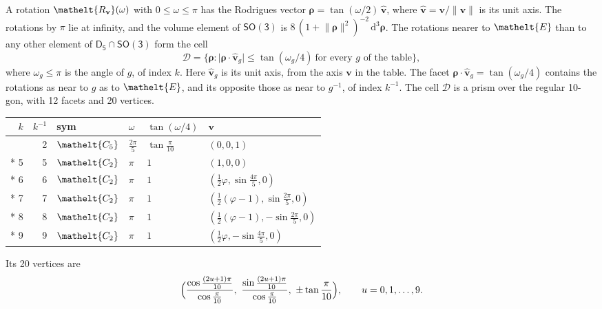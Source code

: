 \documentclass[10pt,a4paper]{article}
\numberwithin{equation}{section}
\newcommand{\eltfont}[1]{{\let\sigma\eltsigma\mathelt{#1}}}
\newcommand{\grp}[1]{\mathsf{#1}}
\newcommand{\cls}[1]{\eltfont{#1}}
\newcommand{\elt}[1]{\eltfont{#1}}
\newcommand{\dirvec}[3]{(#1, #2, #3)}
\newcommand{\unitaxis}{\hat{\mathbf{v}}}
\newcommand{\vv}{\mathbf{v}}
\newcommand{\diff}{\mathrm{d}}
\newcommand{\goldenratio}{\varphi}
\newcommand{\rodrigues}{\boldsymbol{\rho}}
\newcommand{\fcell}{\mathcal{D}}
\begin{document}
\leavevmode\label{n:vector.rodrigues}\label{n:vector.unitaxis}A rotation $\elt{R_{\vv}}(\omega)$ with $0 \le \omega \le \pi$ has the Rodrigues vector $\rodrigues = \tan(\omega/2)\,\unitaxis$, where $\unitaxis = \vv/\lVert\vv\rVert$ is its unit axis. The rotations by $\pi$ lie at infinity, and the volume element of \href{SO3.pdf}{$\grp{SO(3)}$} is $8\,(1 + \lVert\rodrigues\rVert^2)^{-2}\,\diff^3\rodrigues$.
\leavevmode\label{n:set.cell}The rotations nearer to $\elt{E}$ than to any other element of $\grp{D_{5}} \cap \grp{SO(3)}$ form the cell
\begin{equation}\label{e:cell}\fcell = \bigl\{\rodrigues : \lvert\rodrigues\cdot\unitaxis_g\rvert \le \tan(\omega_g/4)\ \text{for every $g$ of the table}\bigr\},\end{equation}
where $\omega_g \le \pi$ is the angle of $g$, of index $k$. Here $\unitaxis_g$ is its unit axis, from the axis $\vv$ in the table. The facet $\rodrigues\cdot\unitaxis_g = \tan(\omega_g/4)$ contains the rotations as near to $g$ as to $\elt{E}$, and its opposite those as near to $g^{-1}$, of index $k^{-1}$. The cell $\fcell$ is a prism over the regular 10-gon, with 12 facets and 20 vertices.
{\small{\renewcommand{\arraystretch}{1.3}\begin{longtable}{@{}rrllll@{}}\toprule
$k$ & $k^{-1}$ & sym & $\omega$ & $\tan(\omega/4)$ & $\vv$\\\midrule\endhead
\bottomrule\endfoot\endlastfoot
1 & 2 & $\cls{C_{5}}$ & $\tfrac{2\pi}{5}$ & $\tan\tfrac{\pi}{10}$ & $\dirvec{0}{0}{1}$\\*
5 & 5 & $\cls{C_{2}}$ & $\pi$ & $1$ & $\dirvec{1}{0}{0}$\\*
6 & 6 & $\cls{C_{2}}$ & $\pi$ & $1$ & $\dirvec{\tfrac{1}{2}\goldenratio{}}{\sin\tfrac{4\pi}{5}}{0}$\\*
7 & 7 & $\cls{C_{2}}$ & $\pi$ & $1$ & $\dirvec{\tfrac{1}{2}(\goldenratio - 1)}{\sin\tfrac{2\pi}{5}}{0}$\\*
8 & 8 & $\cls{C_{2}}$ & $\pi$ & $1$ & $\dirvec{\tfrac{1}{2}(\goldenratio - 1)}{-\sin\tfrac{2\pi}{5}}{0}$\\*
9 & 9 & $\cls{C_{2}}$ & $\pi$ & $1$ & $\dirvec{\tfrac{1}{2}\goldenratio{}}{-\sin\tfrac{4\pi}{5}}{0}$\\
\bottomrule\end{longtable}}}
\leavevmode\label{n:local.vertex.u}Its 20 vertices are
\begin{equation}\label{e:prism}\Bigl(\frac{\cos\frac{(2u+1)\pi}{10}}{\cos\frac{\pi}{10}},\ \frac{\sin\frac{(2u+1)\pi}{10}}{\cos\frac{\pi}{10}},\ \pm\tan\frac{\pi}{10}\Bigr),\qquad u = 0, 1, \dots, 9.\end{equation}
\end{document}
